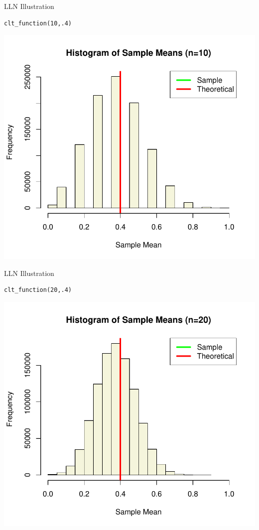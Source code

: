 \begin{frame}[fragile]{LLN Illustration}
\begin{lstlisting}
clt_function(10,.4)
\end{lstlisting}
\begin{center}
\includegraphics[height=.8\textheight]{clt10}
\end{center}
\end{frame}


\begin{frame}[fragile]{LLN Illustration}
\begin{lstlisting}
clt_function(20,.4)
\end{lstlisting}
\begin{center}
\includegraphics[height=.8\textheight]{clt20}
\end{center}
\end{frame}


